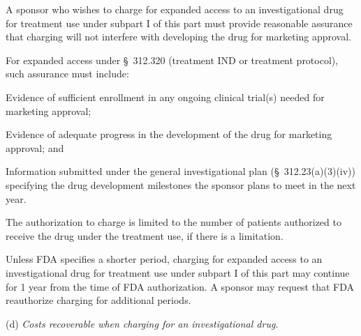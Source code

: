 \documentclass[11pt]{article}
\begin{document}
\begin{description}[leftmargin=0.5cm,style=sameline]
\item[(1)] A sponsor who wishes to charge for expanded access to an investigational drug for treatment use under subpart I of this part must provide reasonable assurance that charging will not interfere with developing the drug for marketing approval.
\item[(2)] For expanded access under \S~312.320 (treatment IND or treatment protocol), such assurance must include:
\begin{description}[leftmargin=0.8cm,style=sameline]
\item[(i)] Evidence of sufficient enrollment in any ongoing clinical trial(s) needed for marketing approval;
\item[(ii)] Evidence of adequate progress in the development of the drug for marketing approval; and
\item[(iii)] Information submitted under the general investigational plan (\S~312.23(a)(3)(iv)) specifying the drug development milestones the sponsor plans to meet in the next year.
\end{description}
\item[(3)] The authorization to charge is limited to the number of patients authorized to receive the drug under the treatment use, if there is a limitation.
\item[(4)] Unless FDA specifies a shorter period, charging for expanded access to an investigational drug for treatment use under subpart I of this part may continue for 1 year from the time of FDA authorization. A sponsor may request that FDA reauthorize charging for additional periods.
\end{description}

(d) \textit{Costs recoverable when charging for an investigational drug.}
\end{document}
